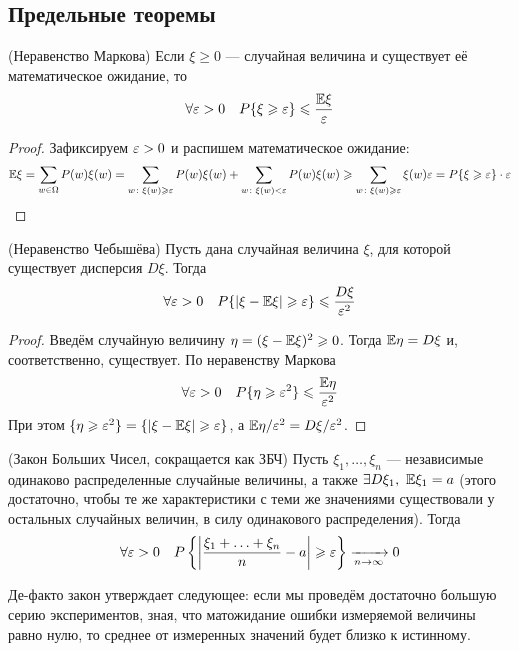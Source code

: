 \subsection{Предельные теоремы}

\begin{theorem} (Неравенство Маркова)
	Если $\xi \ge 0$ --- случайная величина и существует её математическое ожидание, то
	\[
		\forall \varepsilon > 0 \quad P\{\xi \geqslant \varepsilon\} \leqslant \frac{\mathbb{E}\xi}{\varepsilon}
	\]
\end{theorem}

\begin{proof}
	Зафиксируем $\varepsilon > 0$ и распишем математическое ожидание:
	\[
		\mathbb{E}\xi = \sum_{w \in \Omega} P(w)\xi(w) = \sum_{w \colon \xi(w) \geqslant \varepsilon} P(w)\xi(w) + \sum_{w \colon \xi(w) < \varepsilon} P(w)\xi(w) \geqslant \sum_{w \colon \xi(w) \geqslant \varepsilon} \xi(w)\varepsilon = P\{\xi \geqslant \varepsilon\} \cdot \varepsilon
	\]
\end{proof}

\begin{corollary} (Неравенство Чебышёва)
	Пусть дана случайная величина $\xi$, для которой существует дисперсия $D\xi$. Тогда
	\[
		\forall \varepsilon > 0 \quad P\{|\xi - \mathbb{E}\xi| \geqslant \varepsilon\} \leqslant \frac{D\xi}{\varepsilon^2}
	\]
\end{corollary}

\begin{proof}
	Введём случайную величину $\eta = (\xi - \mathbb{E}\xi)^2 \geqslant 0$. Тогда $\mathbb{E}\eta = D\xi$ и, соответственно, существует. По неравенству Маркова
	\[
		\forall \varepsilon > 0 \quad P\{\eta \geqslant \varepsilon^2\} \leqslant \frac{\mathbb{E}\eta}{\varepsilon^2}
	\]
	При этом $\{\eta \geqslant \varepsilon^2\} = \{|\xi - \mathbb{E}\xi| \geqslant \varepsilon\}$, а $\mathbb{E}\eta / \varepsilon^2 = D\xi / \varepsilon^2$.
\end{proof}

\begin{theorem} (Закон Больших Чисел, сокращается как ЗБЧ)
	Пусть $\xi_1, \ldots, \xi_n$ --- независимые одинаково распределенные случайные величины, а также $\exists D\xi_1,\ \mathbb{E}\xi_1 = a$ (этого достаточно, чтобы те же характеристики с теми же значениями существовали у остальных случайных величин, в силу одинакового распределения). Тогда
	\[
		\forall \varepsilon > 0 \quad P\left\{\left|\frac{\xi_1 + \ldots + \xi_n}{n} - a\right| \geqslant \varepsilon\right\} \xrightarrow[n \to \infty]{} 0
	\]
\end{theorem}

\begin{note}
	Де-факто закон утверждает следующее: если мы проведём достаточно большую серию экспериментов, зная, что матожидание ошибки измеряемой величины равно нулю, то среднее от измеренных значений будет близко к истинному.
\end{note}

